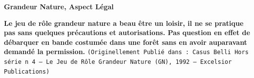 \documentclass[11pt,twoside,a4paper]{article}
\title{\txtTITLE}
\date{ --- }
\def\txtTITLE{Grandeur Nature, Aspect L{\'e}gal} %
\begin{document}
\setlength\parindent{0pt} %

\begin{center}
	\textbf{\huge \txtTITLE}
\end{center}


\textbf{\scriptsize Le jeu de r{\^o}le grandeur nature a beau {\^e}tre un loisir, il ne se pratique pas sans quelques pr{\'e}cautions et autorisations. Pas question en effet de d{\'e}barquer en bande costum{\'e}e dans une for{\^e}t sans en avoir auparavant demand{\'e} la permission. } %
\texttt{\scriptsize{(Originellement Publi{\'e} dans : Casus Belli Hors s{\'e}rie n 4 -- Le Jeu de R{\^o}le Grandeur Nature (GN), 1992 -- Excelsior Publications)}}~\\
\end{document}
